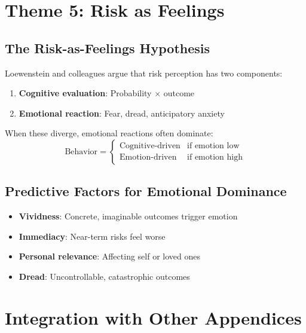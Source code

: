 \section{Theme 5: Risk as Feelings}
\label{sec:lo-risk}

\subsection{The Risk-as-Feelings Hypothesis}

Loewenstein and colleagues \citep{loewenstein2000emotions} argue that risk perception has two components:

\begin{enumerate}[nosep]
\item \textbf{Cognitive evaluation}: Probability $\times$ outcome
\item \textbf{Emotional reaction}: Fear, dread, anticipatory anxiety
\end{enumerate}

When these diverge, emotional reactions often dominate:
\begin{equation}
\text{Behavior} = \begin{cases}
\text{Cognitive-driven} & \text{if emotion low} \\
\text{Emotion-driven} & \text{if emotion high}
\end{cases}
\end{equation}

\subsection{Predictive Factors for Emotional Dominance}

\begin{itemize}[nosep]
\item \textbf{Vividness}: Concrete, imaginable outcomes trigger emotion
\item \textbf{Immediacy}: Near-term risks feel worse
\item \textbf{Personal relevance}: Affecting self or loved ones
\item \textbf{Dread}: Uncontrollable, catastrophic outcomes
\end{itemize}


\section{Integration with Other Appendices}
\label{sec:lo-integration}

